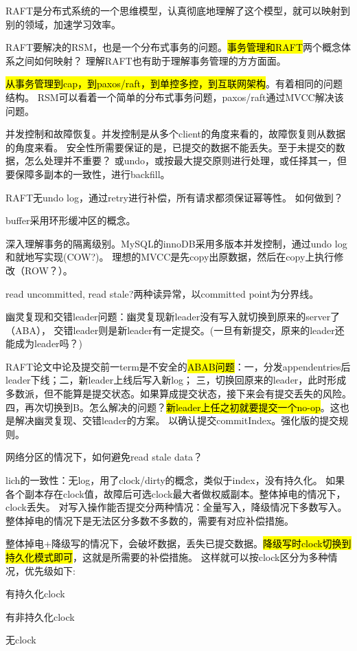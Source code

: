 RAFT是分布式系统的一个思维模型，认真彻底地理解了这个模型，就可以映射到别的领域，加速学习效率。

RAFT要解决的RSM，也是一个分布式事务的问题。\hl{事务管理和RAFT}两个概念体系之间如何映射？
理解RAFT也有助于理解事务管理的方方面面。

\hl{从事务管理到cap，到paxos/raft，到单控多控，到互联网架构}。有着相同的问题结构。
RSM可以看着一个简单的分布式事务问题，paxos/raft通过MVCC解决该问题。

并发控制和故障恢复。并发控制是从多个client的角度来看的，故障恢复则从数据的角度来看。
安全性所需要保证的是，已提交的数据不能丢失。至于未提交的数据，怎么处理并不重要？
或undo，或按最大提交原则进行处理，或任择其一，但要保障多副本的一致性，进行backfill。

RAFT无undo log，通过retry进行补偿，所有请求都须保证幂等性。
如何做到？

\hrulefill

buffer采用环形缓冲区的概念。

深入理解事务的隔离级别。MySQL的innoDB采用多版本并发控制，通过undo log和就地写实现(COW?)。
理想的MVCC是先copy出原数据，然后在copy上执行修改（ROW？）。

read uncommitted, read stale?两种读异常，以committed point为分界线。

幽灵复现和交错leader问题：幽灵复现新leader没有写入就切换到原来的server了（ABA），
交错leader则是新leader有一定提交。(一旦有新提交，原来的leader还能成为leader吗？)

RAFT论文中论及提交前一term是不安全的\hl{ABAB问题}：一，分发appendentries后leader下线；二，新leader上线后写入新log；
三，切换回原来的leader，此时形成多数派，但不能算是提交状态。如果算成提交状态，接下来会有提交丢失的风险。
四，再次切换到B。怎么解决的问题？\hl{新leader上任之初就要提交一个no-op}。这也是解决幽灵复现、交错leader的方案。
以确认提交commitIndex。强化版的提交规则。

网络分区的情况下，如何避免read stale data？

\hrulefill

lich的一致性：无log，用了clock/dirty的概念，类似于index，没有持久化。
如果各个副本存在clock值，故障后可选clock最大者做权威副本。整体掉电的情况下，clock丢失。
对写入操作能否提交分两种情况：全量写入，降级情况下多数写入。
整体掉电的情况下是无法区分多数不多数的，需要有对应补偿措施。

整体掉电+降级写的情况下，会破坏数据，丢失已提交数据。\hl{降级写时clock切换到持久化模式即可}，这就是所需要的补偿措施。
这样就可以按clock区分为多种情况，优先级如下:
\begin{enumbox}
\item 有持久化clock
\item 有非持久化clock
\item 无clock
\end{enumbox}

